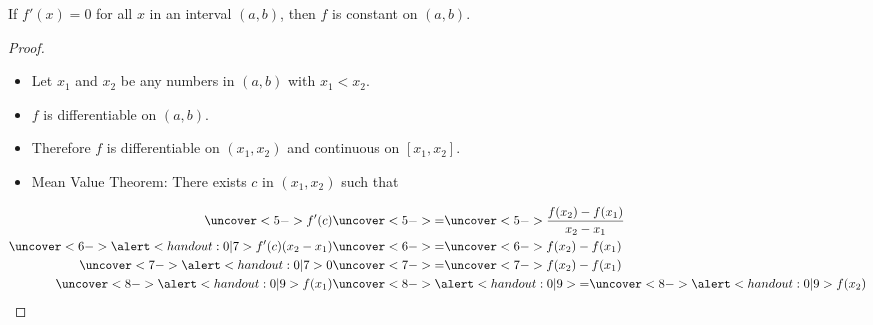 \begin{frame}
\begin{theorem}
If \alert<handout:0| 3,7>{$f'(x) = 0$ for all $x$ in an interval $(a,b)$}, then $f$ is constant on $(a,b)$.
\end{theorem}
\begin{proof}
\begin{itemize}
\item<2-| alert@9>  Let $x_1$ and $x_2$ be any numbers in $(a,b)$ with $x_1 < x_2$.
\item<3->  $f$ is differentiable on $(a,b)$.
\item<4->  Therefore $f$ is differentiable on $(x_1, x_2)$ and continuous on $[x_1, x_2]$.
\item<5->  Mean Value Theorem: There exists $c$ in $(x_1, x_2)$ such that
\end{itemize}
\abovedisplayskip=0pt
\belowdisplayskip=0pt
\abovedisplayshortskip=0pt
\belowdisplayshortskip=0pt
\begin{align*}
\uncover<5->{%
f'(c)%
}%
& \uncover<5->{ = } %
\uncover<5->{%
\frac{f(x_2)-f(x_1)}{x_2-x_1}%
}\\%
\uncover<6->{%
\alert<handout:0| 7>{f'(c)}(x_2-x_1)%
}%
& \uncover<6->{ = } %
\uncover<6->{%
f(x_2)-f(x_1)%
}\\%
\uncover<7->{%
\alert<handout:0| 7>{0}%
}%
& \uncover<7->{ = } %
\uncover<7->{%
f(x_2)-f(x_1)%
}\\%
\uncover<8->{%
\alert<handout:0| 9>{f(x_1)}%
}%
& \uncover<8->{\alert<handout:0| 9>{ = }} %
\uncover<8->{%
\alert<handout:0| 9>{f(x_2)}%
}%
\end{align*}
%
\end{proof}
\end{frame}
